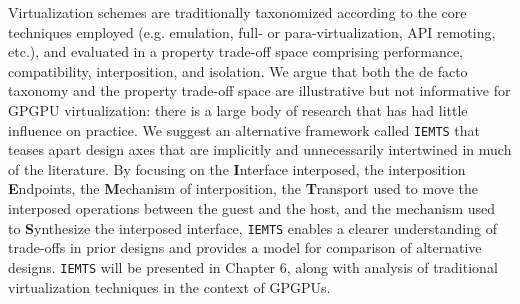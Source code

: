 Virtualization schemes are traditionally taxonomized according to the core techniques employed (e.g. emulation, full- or para-virtualization, API remoting, etc.), and evaluated in a property trade-off space comprising performance, compatibility, interposition, and isolation. We argue that both the de facto taxonomy and the property trade-off space are illustrative but not informative for GPGPU virtualization: there is a large body of research that has had little influence on practice. We suggest an alternative framework called \texttt{IEMTS} that teases apart design axes that are implicitly and unnecessarily intertwined in much of the literature. By focusing on the \textbf{I}nterface interposed, the interposition \textbf{E}ndpoints, the \textbf{M}echanism of interposition, the \textbf{T}ransport used to move the interposed operations between the guest and the host, and the mechanism used to \textbf{S}ynthesize the interposed interface, \texttt{IEMTS} enables a clearer understanding of trade-offs in prior designs and provides a model for comparison of alternative designs. \texttt{IEMTS} will be presented in Chapter 6, along with analysis of traditional virtualization techniques in the context of GPGPUs.